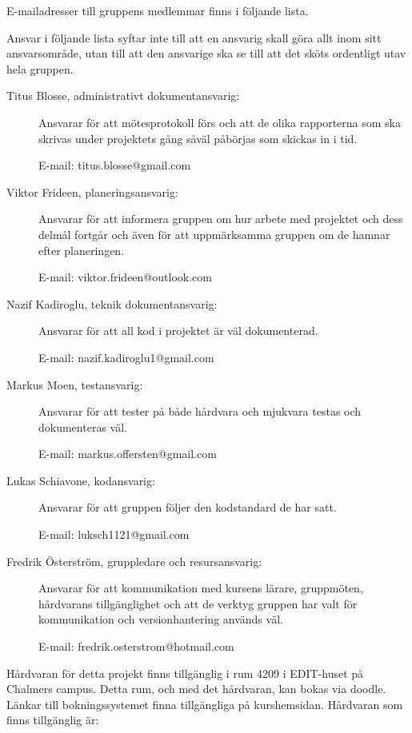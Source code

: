 \documentclass[a4paper]{article}
\begin{document}
E-mailadresser till gruppens medlemmar finns i följande lista. 

Ansvar i följande lista syftar inte till att en ansvarig skall göra allt inom sitt ansvarsområde, utan till att den ansvarige ska se till att det sköts ordentligt utav hela gruppen.

\begin{description}
    \item[Titus Blosse, administrativt dokumentansvarig:] Ansvarar för att mötesprotokoll förs och att de olika rapporterna som ska skrivas under projektets gång såväl påbörjas som skickas in i tid.

    E-mail: titus.blosse@gmail.com

    \item[Viktor Frideen, planeringsansvarig:] Ansvarar för att informera gruppen om hur arbete med projektet och dess delmål fortgår och även för att uppmärksamma gruppen om de hamnar efter planeringen.

    E-mail: viktor.frideen@outlook.com

    \item[Nazif Kadiroglu, teknik dokumentansvarig:] Ansvarar för att all kod i projektet är väl dokumenterad.

    E-mail: nazif.kadiroglu1@gmail.com

    \item[Markus Moen, testansvarig:] Ansvarar för att tester på både hårdvara och mjukvara testas och dokumenteras väl.

    E-mail: markus.offersten@gmail.com

    \item[Lukas Schiavone, kodansvarig:] Ansvarar för att gruppen följer den kodstandard de har satt.

    E-mail: luksch1121@gmail.com

    \item[Fredrik Österström, gruppledare och resursansvarig:] Ansvarar för att kommunikation med kursens lärare, gruppmöten, hårdvarans tillgänglighet och att de verktyg gruppen har valt för kommunikation och versionhantering används väl.

    E-mail: fredrik.osterstrom@hotmail.com
\end{description}

Hårdvaran för detta projekt finns tillgänglig i rum 4209 i EDIT-huset på Chalmers campus. Detta rum, och med det hårdvaran, kan bokas via doodle. Länkar till bokningssystemet finna tillgängliga på kurshemsidan. Hårdvaran som finns tillgänglig är:
\end{document}
